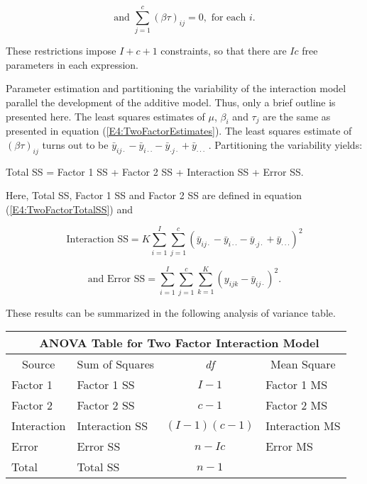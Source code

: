 \begin{equation*}
\text{and }\sum_{j=1}^{c}(\beta \tau )_{ij}=0,\text{ \ for each }i.
\end{equation*}

\noindent These restrictions impose $I+c+1$ constraints, so that
there are $Ic$ free parameters in each expression.

Parameter estimation and partitioning the variability of the
interaction model parallel the development of the additive model.
Thus, only a brief outline is presented here. The least squares
estimates of $\mu $, $\beta _{i} $ and $\tau _{j}$ are the same as
presented in equation (\ref{E4:TwoFactorEstimates}). The least
squares estimate of $(\beta \tau )_{ij}$ turns out to be $\bar{y}_{ij\cdot }-%
\bar{y}_{i\cdot \cdot }-\bar{y}_{\cdot j\cdot }+\bar{y}_{\cdot \cdot \cdot }$%
. Partitioning the variability yields:

\begin{center}
Total SS = Factor 1 SS + Factor 2 SS + Interaction SS + Error SS.
\end{center}

Here, Total SS, Factor 1 SS and Factor 2 SS are defined in equation
(\ref{E4:TwoFactorTotalSS}) and

\begin{equation*}
\text{Interaction SS}=K\sum_{i=1}^{I}\sum_{j=1}^{c}(\bar{y}_{ij\cdot }-\bar{y%
}_{i\cdot \cdot }-\bar{y}_{\cdot j\cdot }+\bar{y}_{\cdot \cdot \cdot
})^{2}
\end{equation*}

\begin{equation*}
\text{and \ \  Error SS}=\sum_{i=1}^{I}\sum_{j=1}^{c}\sum_{k=1}^{K}(y_{ijk}-%
\bar{y}_{ij\cdot })^{2}.
\end{equation*}

These results can be summarized in the following analysis of
variance table.

\begin{center}
\begin{tabular}{cccc}
\multicolumn{4}{c}{\textbf{\ }ANOVA Table for Two Factor Interaction Model} \\

\hline Source & Sum of Squares & \textit{df} & Mean Square \\ \hline
\multicolumn{1}{l}{Factor 1} & \multicolumn{1}{l}{Factor 1 SS} &
$I-1$ &
\multicolumn{1}{l}{Factor 1 MS} \\
\multicolumn{1}{l}{Factor 2} & \multicolumn{1}{l}{Factor 2 SS} &
$c-1$ &
\multicolumn{1}{l}{Factor 2 MS} \\
\multicolumn{1}{l}{Interaction} & \multicolumn{1}{l}{Interaction SS} & $%
(I-1)(c-1)$ & \multicolumn{1}{l}{Interaction MS} \\
\multicolumn{1}{l}{Error} & \multicolumn{1}{l}{Error SS} & $n-Ic$ &
\multicolumn{1}{l}{Error MS} \\
\multicolumn{1}{l}{Total} & \multicolumn{1}{l}{Total SS} & $n-1$ &
\multicolumn{1}{l}{} \\ \hline
\end{tabular}
\end{center}

